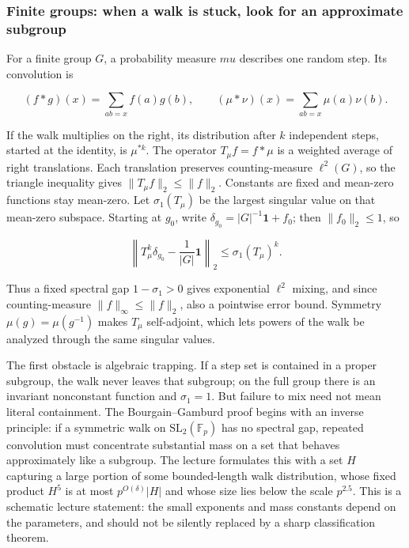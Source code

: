 \subsubsection{Finite groups: when a walk is stuck, look for an approximate subgroup}\label{04-visual-computing-ii-ch033-finite-groups-when-a-walk-is-stuck-look-for-an-approximate-subgroup}

\hypertarget{04-visual-computing-ii-ch033-finite-groups-when-a-walk-is-stuck-look-for-an-approximate-subgroup}{}

For a finite group \(G\), a probability measure \(mu\) describes one random step. Its convolution is

\[ (f*g)(x)=\sum_{ab=x}f(a)g(b),\qquad (\mu*\nu)(x)=\sum_{ab=x}\mu(a)\nu(b). \]

If the walk multiplies on the right, its distribution after \(k\) independent steps, started at the identity, is \(\mu^{*k}\). The operator \(T_\mu f=f*\mu\) is a weighted average of right translations. Each translation preserves counting-measure \(\ell^2(G)\), so the triangle inequality gives \(\|T_\mu f\|_2\leq\|f\|_2\). Constants are fixed and mean-zero functions stay mean-zero. Let \(\sigma_1(T_\mu)\) be the largest singular value on that mean-zero subspace. Starting at \(g_0\), write \(\delta_{g_0}=|G|^{-1}\mathbf 1+f_0\); then \(\|f_0\|_2\leq1\), so

\[ \left\|T_\mu^k\delta_{g_0}-\frac{1}{|G|}\mathbf 1\right\|_2\leq \sigma_1(T_\mu)^k. \]

Thus a fixed spectral gap \(1-\sigma_1>0\) gives exponential \(\ell^2\) mixing, and since counting-measure \(\|f\|_\infty\leq\|f\|_2\), also a pointwise error bound. Symmetry \(\mu(g)=\mu(g^{-1})\) makes \(T_\mu\) self-adjoint, which lets powers of the walk be analyzed through the same singular values.

The first obstacle is algebraic trapping. If a step set is contained in a proper subgroup, the walk never leaves that subgroup; on the full group there is an invariant nonconstant function and \(\sigma_1=1\). But failure to mix need not mean literal containment. The Bourgain--Gamburd proof begins with an inverse principle: if a symmetric walk on \(\mathrm{SL}_2(\mathbb F_p)\) has no spectral gap, repeated convolution must concentrate substantial mass on a set that behaves approximately like a subgroup. The lecture formulates this with a set \(H\) capturing a large portion of some bounded-length walk distribution, whose fixed product \(H^5\) is at most \(p^{O(\delta)}|H|\) and whose size lies below the scale \(p^{2.5}\). This is a schematic lecture statement: the small exponents and mass constants depend on the parameters, and should not be silently replaced by a sharp classification theorem.

